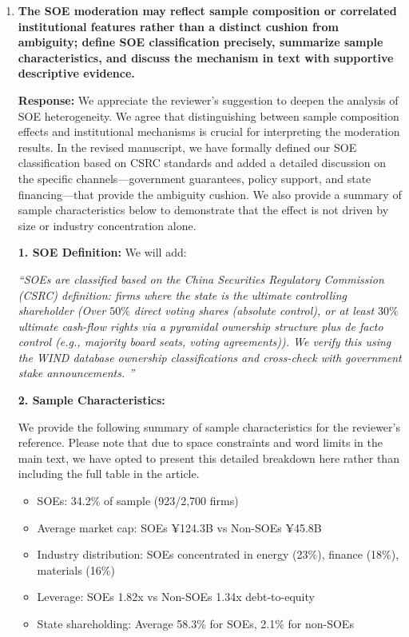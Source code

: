 \documentclass[12pt]{article}
\begin{document}
\begin{enumerate}
    \vspace{0.5cm}

    \item \textbf{The SOE moderation may reflect sample composition or correlated institutional features rather than a distinct cushion from ambiguity; define SOE classification precisely, summarize sample characteristics, and discuss the mechanism in text with supportive descriptive evidence.}

    \begin{responsebox}
        
    \textbf{Response:} We appreciate the reviewer's suggestion to deepen the analysis of SOE heterogeneity. We agree that distinguishing between sample composition effects and institutional mechanisms is crucial for interpreting the moderation results. In the revised manuscript, we have formally defined our SOE classification based on CSRC standards and added a detailed discussion on the specific channels---government guarantees, policy support, and state financing---that provide the ambiguity cushion. We also provide a summary of sample characteristics below to demonstrate that the effect is not driven by size or industry concentration alone.

    \textbf{1. SOE Definition:}
    We will add:

    \vspace{0.5cm}
    \textit{``SOEs are classified based on the China Securities Regulatory Commission (CSRC) definition: firms where the state is the ultimate controlling shareholder (Over $50\%$ direct voting shares (absolute control), or at least $30\%$ ultimate cash-flow rights via a pyramidal ownership structure plus de facto control (e.g., majority board seats, voting agreements)). We verify this using the WIND database ownership classifications and cross-check with government stake announcements. ''}

    \textbf{2. Sample Characteristics:}
    
    We provide the following summary of sample characteristics for the reviewer's reference. Please note that due to space constraints and word limits in the main text, we have opted to present this detailed breakdown here rather than including the full table in the article.
    \begin{itemize}
        \item SOEs: 34.2\% of sample (923/2,700 firms)
        \item Average market cap: SOEs ¥124.3B vs Non-SOEs ¥45.8B
        \item Industry distribution: SOEs concentrated in energy (23\%), finance (18\%), materials (16\%)
        \item Leverage: SOEs 1.82x vs Non-SOEs 1.34x debt-to-equity
        \item State shareholding: Average 58.3\% for SOEs, 2.1\% for non-SOEs
    \end{itemize}


\end{responsebox}
\end{enumerate}
\end{document}
